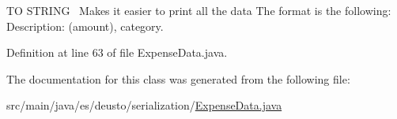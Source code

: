 TO S\+T\+R\+I\+NG~\newline
Makes it easier to print all the data The format is the following\+:~\newline
Description\+: (amount), category. 

Definition at line 63 of file Expense\+Data.\+java.



The documentation for this class was generated from the following file\+:\begin{DoxyCompactItemize}
\item 
src/main/java/es/deusto/serialization/\hyperlink{_expense_data_8java}{Expense\+Data.\+java}\end{DoxyCompactItemize}
